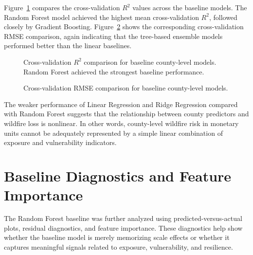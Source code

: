 \begin{table}[htbp]
    \centering
    \caption{Combined test-set and cross-validation performance of the baseline county-level wildfire EAL models.}
    \label{tab:baseline_model_performance_summary_export}
\end{table}

Figure~\ref{fig:baseline_cv_r2_comparison} compares the cross-validation $R^2$ values across the baseline models. The Random Forest model achieved the highest mean cross-validation $R^2$, followed closely by Gradient Boosting. Figure~\ref{fig:baseline_cv_rmse_comparison} shows the corresponding cross-validation RMSE comparison, again indicating that the tree-based ensemble models performed better than the linear baselines.

\begin{figure}[htbp]
    \centering
    \caption{Cross-validation $R^2$ comparison for baseline county-level models. Random Forest achieved the strongest baseline performance.}
    \label{fig:baseline_cv_r2_comparison}
\end{figure}

\begin{figure}[htbp]
    \centering
    \caption{Cross-validation RMSE comparison for baseline county-level models.}
    \label{fig:baseline_cv_rmse_comparison}
\end{figure}

The weaker performance of Linear Regression and Ridge Regression compared with Random Forest suggests that the relationship between county predictors and wildfire loss is nonlinear. In other words, county-level wildfire risk in monetary units cannot be adequately represented by a simple linear combination of exposure and vulnerability indicators.

\section{Baseline Diagnostics and Feature Importance}

The Random Forest baseline was further analyzed using predicted-versus-actual plots, residual diagnostics, and feature importance. These diagnostics help show whether the baseline model is merely memorizing scale effects or whether it captures meaningful signals related to exposure, vulnerability, and resilience.

